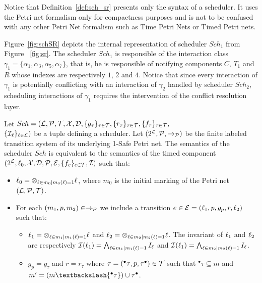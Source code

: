 Notice that Definition~\ref{def:sch_sr} presents only the syntax of a scheduler. It uses 
the Petri net formalism only for compactness purposes and is not to be confused with 
any other Petri Net formalism such as Time Petri Nets or Timed Petri nets.

\begin{example}
  Figure~\ref{fig:schSR} depicts the internal representation of scheduler $Sch_1$ from Figure
  ~\ref{fig:sr}. The scheduler $Sch_1$ is responsible of the interaction class $\gamma_1=\{
    \alpha_1,\alpha_3,\alpha_5,\alpha_7\}$, that is, he is responsible of notifying components
  $C$, $T_1$ and $R$ whose indexes are respectively $1$, $2$ and $4$. Notice that since 
  every interaction of $\gamma_1$ is potentially conflicting with an interaction of $\gamma_2$
  handled by scheduler $Sch_2$, scheduling interactions of $\gamma_1$ requires the intervention
  of the conflict resolution layer.
\end{example}
\begin{property}\label{pr:sch_sr_sem}
  Let $Sch=(\mathcal{L}, \mathcal{P},\mathcal{T},\mathcal{X}, \mathcal{D},\{g_{\tau}\}_{\tau\in\mathcal{T}},\{r_{\tau}\}_{\tau\in\mathcal{T}},
    \{f_{\tau}\}_{\tau\in\mathcal{T}},$\\$\{\mathcal{I}_{\ell}\}_{\ell\in\mathcal{L}})$ be a tuple defining 
  a scheduler. Let $(2^{\mathcal{L}},\mathcal{P},\to_{\mathcal{P}})$ be the finite labeled transition
  system of its underlying 1-Safe Petri net. The semantics of the scheduler $Sch$ 
  is equivalent to the semantics of the timed component 
  $(2^{\mathcal{L}},\ell_0,\mathcal{X},\mathcal{D},\mathcal{P},\mathcal{E},\{f_{e}\}_{e\in\mathcal{T}},\mathcal{I})$ such that:
  \begin{itemize}
    \item $\ell_0=\otimes_{\ell\in m_0|m_0(\ell)=1}\ell$, where $m_0$ is the initial marking 
      of the Petri net $(\mathcal{L}, \mathcal{P},\mathcal{T})$.
    \item For each $(m_1,p,m_2)\in\to_{\mathcal{P}}$ we include a transition $e\in\mathcal{E}=
      (\ell_1,p,g_p,r,\ell_2)$ such that:
      \begin{itemize}
        \item $\ell_1=\otimes_{\ell\in m_1|m_1(\ell)=1}\ell$ and
              $\ell_2=\otimes_{\ell\in m_2|m_2(\ell)=1}\ell$. The invariant of $\ell_1$ and 
              $\ell_2$ are respectively 
              $\mathcal{I}(\ell_1)=\bigwedge_{\ell\in m_1|m_1(\ell)=1}I_{\ell}$ and
              $\mathcal{I}(\ell_1)=\bigwedge_{\ell\in m_2|m_2(\ell)=1}I_{\ell}$.
            \item $g_p=g_{\tau}$ and $r=r_{\tau}$ where 
              $\tau=({^\bullet\tau},p,{\tau^\bullet })\in\mathcal{T}$ such that
            ${^\bullet\tau}\subseteq m$ and $m'=(m\textbackslash{^\bullet\tau})
  \cup{\tau^\bullet }$.
      \end{itemize}
  \end{itemize}
\end{property}




